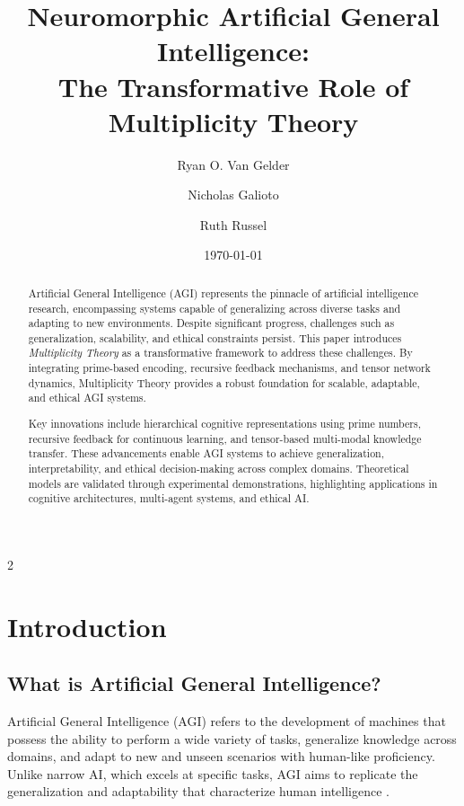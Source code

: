 \documentclass{article}
\theoremstyle{plain}
\begin{document}
\title{Neuromorphic Artificial General Intelligence:\\ The Transformative Role of Multiplicity Theory}

\author[1]{Ryan O. Van Gelder}
\author[2]{Nicholas Galioto}
\author[3]{Ruth Russel}
\date{\today}

\maketitle

\begin{abstract}

Artificial General Intelligence (AGI) represents the pinnacle of artificial intelligence research, encompassing systems capable of generalizing across diverse tasks and adapting to new environments. Despite significant progress, challenges such as generalization, scalability, and ethical constraints persist. This paper introduces \textit{Multiplicity Theory} as a transformative framework to address these challenges. By integrating prime-based encoding, recursive feedback mechanisms, and tensor network dynamics, Multiplicity Theory provides a robust foundation for scalable, adaptable, and ethical AGI systems.

Key innovations include hierarchical cognitive representations using prime numbers, recursive feedback for continuous learning, and tensor-based multi-modal knowledge transfer. These advancements enable AGI systems to achieve generalization, interpretability, and ethical decision-making across complex domains. Theoretical models are validated through experimental demonstrations, highlighting applications in cognitive architectures, multi-agent systems, and ethical AI.

\end{abstract}
\newpage
\begin{multicols}{2}
\begin{singlespace}
\tableofcontents
\end{singlespace}
\end{multicols}

\section{Introduction}

\subsection{What is Artificial General Intelligence?}
Artificial General Intelligence (AGI) refers to the development of machines that possess the ability to perform a wide variety of tasks, generalize knowledge across domains, and adapt to new and unseen scenarios with human-like proficiency. Unlike narrow AI, which excels at specific tasks, AGI aims to replicate the generalization and adaptability that characterize human intelligence \cite{goertzel2007agi}. 
\end{document}
